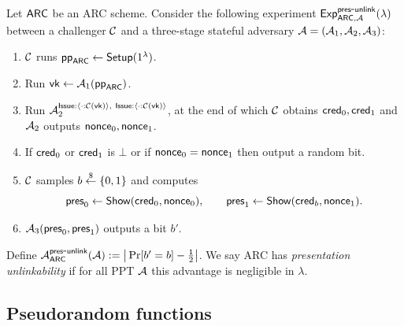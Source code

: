 \begin{definition}\label{def:pres-unlink}
Let $\mathsf{ARC}$ be an ARC scheme. Consider the following experiment
$\mathsf{Exp}^{\mathsf{pres\mbox{-}unlink}}_{\mathsf{ARC},\mathcal{A}}(\lambda)$ between a challenger $\mathcal{C}$ and a three-stage stateful adversary $\mathcal{A}=(\mathcal{A}_1,\mathcal{A}_2,\mathcal{A}_3)$:
\begin{enumerate}[leftmargin=1.25em]
  \item $\mathcal{C}$ runs $\mathsf{pp}_{\mathsf{ARC}}\gets \mathsf{Setup}(1^\lambda)$.
  \item Run $\mathsf{vk}\gets \mathcal{A}_1(\mathsf{pp}_{\mathsf{ARC}})$.
  \item Run $\mathcal{A}_2^{\mathsf{Issue}:\langle \cdot: \mathcal{C}(\mathsf{vk})\rangle ,~ \mathsf{Issue}:\langle \cdot: \mathcal{C}(\mathsf{vk})\rangle }$, at the end of which $\mathcal{C}$ obtains $\mathsf{cred}_0,\mathsf{cred}_1$ and $\mathcal{A}_2$ outputs $\mathsf{nonce}_0,\mathsf{nonce}_1$.
  \item If $\mathsf{cred}_0$ or $\mathsf{cred}_1$ is $\bot$ or if $\mathsf{nonce}_0=\mathsf{nonce}_1$ then output a random bit.

  \item $\mathcal{C}$ samples $b\overset{\$}{\leftarrow}\{0,1\}$ and computes
  \[
    \mathsf{pres}_0 \leftarrow \mathsf{Show}(\mathsf{cred}_0,\mathsf{nonce}_0),\qquad
    \mathsf{pres}_1 \leftarrow \mathsf{Show}(\mathsf{cred}_b,\mathsf{nonce}_1).
  \]
  \item $\mathcal{A}_3(\mathsf{pres}_0,\mathsf{pres}_1)$ outputs a bit $b'$.
\end{enumerate}
Define $\mathcal{A}^{\mathsf{pres\mbox{-}unlink}}_{\mathsf{ARC}}(\mathcal{A}) := \big| \Pr[b'=b]-\tfrac12 \big|$.
We say ARC has \emph{presentation unlinkability} if for all PPT $\mathcal{A}$ this advantage is negligible in $\lambda$.

\end{definition}


\subsection{Pseudorandom functions}
\label{subsec:prelim-prf}
\label{subsec:prf}


